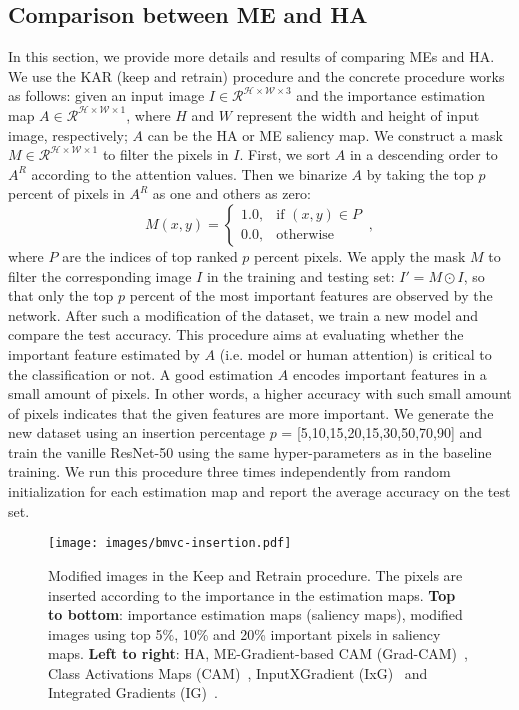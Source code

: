 \documentclass{bmvc2k}
\begin{document}
\subsection{Comparison between ME and HA}
In this section, we provide more details and results of comparing MEs and HA. We use the KAR (keep and retrain) procedure \cite{hooker2018benchmark} and the concrete procedure works as follows: given an input image $I \in \mathcal{R}^{\mathcal{H} \times \mathcal{W} \times 3}$ and the importance estimation map $A \in \mathcal{R}^{\mathcal{H} \times \mathcal{W} \times 1}$, where $H$ and $W$ represent the width and height of input image, respectively; $A$ can be the HA or ME saliency map. We construct a mask $M \in \mathcal{R}^{\mathcal{H} \times \mathcal{W} \times 1}$ to filter the pixels in $I$. First, we sort $A$ in a descending order to $A^R$ according to the attention values. Then we binarize $A$ by taking the top $p$ percent of pixels in $A^R$ as one and others as zero:
\begin{equation*}
    M(x,y)=\begin{cases}1.0, & \text{if }  (x,y) \in P \\0.0, & \text{otherwise} \end{cases} \,,
\end{equation*}
where $P$ are the indices of top ranked $p$ percent pixels.
We apply the mask $M$ to filter the corresponding image $I$ in the training and testing set: $I' = M \odot I$, so that only the top $p$ percent of the most important features are observed by the network. After such a modification of the dataset, we train a new model and compare the test accuracy. This procedure aims at evaluating whether the important feature estimated by $A$ (i.e. model or human attention) is critical to the classification or not. A good estimation $A$ encodes important features in a small amount of pixels. In other words, a higher accuracy with such small amount of pixels indicates that the given features are more important. We generate the new dataset using an insertion percentage $p$ = [5,10,15,20,15,30,50,70,90] and train the vanille ResNet-50 \cite{he2016deep} using the same hyper-parameters as in the baseline training. We run this procedure three times independently from random initialization for each estimation map and report the average accuracy on the test set. 

\begin{figure*}[t]
\centering
         \begin{center}
            \texttt{[image: images/bmvc-insertion.pdf]}
         \end{center}
   \caption{Modified images in the Keep and Retrain procedure. The pixels are inserted according to the importance in the estimation maps. \textbf{Top to bottom}: importance estimation maps (saliency maps), modified images using top 5\%, 10\% and 20\% important pixels in saliency maps. \textbf{Left to right}: HA, ME-Gradient-based CAM (Grad-CAM)~\cite{20_grad_cam}, Class Activations Maps (CAM)~\cite{19_cam}, InputXGradient (IxG)~\cite{shrikumar2016not} and Integrated Gradients (IG)~\cite{IG}.}
   \vspace{-0.5cm}
\label{fig:illustration reveal}
\end{figure*}
\end{document}
